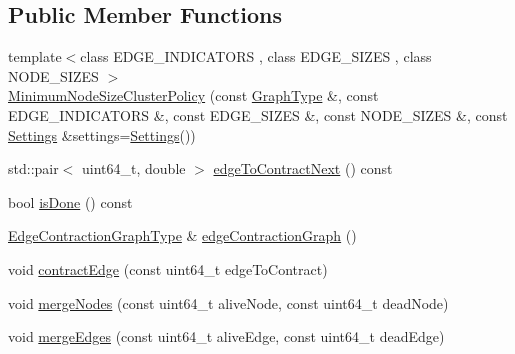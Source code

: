 \subsection*{Public Member Functions}
\begin{DoxyCompactItemize}
\item 
{\footnotesize template$<$class E\+D\+G\+E\+\_\+\+I\+N\+D\+I\+C\+A\+T\+O\+R\+S , class E\+D\+G\+E\+\_\+\+S\+I\+Z\+E\+S , class N\+O\+D\+E\+\_\+\+S\+I\+Z\+E\+S $>$ }\\\hyperlink{classnifty_1_1graph_1_1agglo_1_1MinimumNodeSizeClusterPolicy_a08e86a730e94ac2ca07dd72b29b2694e}{Minimum\+Node\+Size\+Cluster\+Policy} (const \hyperlink{classnifty_1_1graph_1_1agglo_1_1MinimumNodeSizeClusterPolicy_a6d81a64ca67c9feec052a031552282f0}{Graph\+Type} \&, const E\+D\+G\+E\+\_\+\+I\+N\+D\+I\+C\+A\+T\+O\+R\+S \&, const E\+D\+G\+E\+\_\+\+S\+I\+Z\+E\+S \&, const N\+O\+D\+E\+\_\+\+S\+I\+Z\+E\+S \&, const \hyperlink{structnifty_1_1graph_1_1agglo_1_1MinimumNodeSizeClusterPolicy_1_1Settings}{Settings} \&settings=\hyperlink{structnifty_1_1graph_1_1agglo_1_1MinimumNodeSizeClusterPolicy_1_1Settings}{Settings}())
\item 
std\+::pair$<$ uint64\+\_\+t, double $>$ \hyperlink{classnifty_1_1graph_1_1agglo_1_1MinimumNodeSizeClusterPolicy_aa0dedd8886682827b2ca0dd0605249f8}{edge\+To\+Contract\+Next} () const 
\item 
bool \hyperlink{classnifty_1_1graph_1_1agglo_1_1MinimumNodeSizeClusterPolicy_a778912b7bbaae44fd2fd5df495e109bd}{is\+Done} () const 
\item 
\hyperlink{classnifty_1_1graph_1_1agglo_1_1MinimumNodeSizeClusterPolicy_a5c67401c61d1d283b73c3ce8a31faeb9}{Edge\+Contraction\+Graph\+Type} \& \hyperlink{classnifty_1_1graph_1_1agglo_1_1MinimumNodeSizeClusterPolicy_aca43c3bece87aa733c25cef542006a42}{edge\+Contraction\+Graph} ()
\item 
void \hyperlink{classnifty_1_1graph_1_1agglo_1_1MinimumNodeSizeClusterPolicy_a04b27c347d3c6088d1555c1ea4aa429c}{contract\+Edge} (const uint64\+\_\+t edge\+To\+Contract)
\item 
void \hyperlink{classnifty_1_1graph_1_1agglo_1_1MinimumNodeSizeClusterPolicy_a4907559af0facc33614e00b53e46c146}{merge\+Nodes} (const uint64\+\_\+t alive\+Node, const uint64\+\_\+t dead\+Node)
\item 
void \hyperlink{classnifty_1_1graph_1_1agglo_1_1MinimumNodeSizeClusterPolicy_a5e98c7c5a86bbf435affcea45ea5e95f}{merge\+Edges} (const uint64\+\_\+t alive\+Edge, const uint64\+\_\+t dead\+Edge)
\item 

\end{DoxyCompactItemize}
